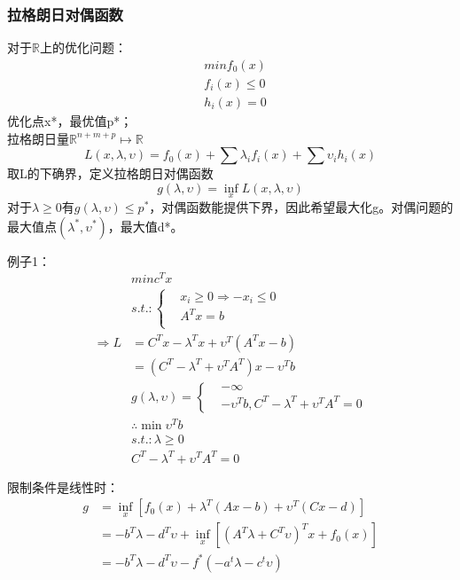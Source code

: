 \documentclass[UTF8]{../computerUniverse}
\begin{document}
\subsubsection{拉格朗日对偶函数}
对于$\mathbb{R}$上的优化问题：
\begin{equation}
\begin{split}
&minf_0(x)\\
&f_i(x)\leqslant 0\\
&h_i(x)=0
\end{split}
\end{equation} 
优化点x*，最优值p*；\\
拉格朗日量$\mathbb R^{n+m+p}\mapsto \mathbb R$
\begin{equation}
L(x,\lambda, \upsilon)=f_0(x)+\sum \lambda_if_i(x)+\sum \upsilon _ih_i(x)
\end{equation}
 取L的下确界，定义拉格朗日对偶函数
 \begin{equation}
    g(\lambda, \upsilon)=\inf_x L(x,\lambda, \upsilon)
\end{equation}
对于$\lambda \geqslant 0$有$g(\lambda, \upsilon) \leqslant p^*$，对偶函数能提供下界，因此希望最大化g。对偶问题的最大值点$(\lambda^*,\upsilon ^*)$，最大值d*。

例子1：
\begin{equation}
\begin{split}
&min c^Tx\\
&s.t.:
\begin{cases}
&x_i\geqslant0 \Rightarrow -x_i\leqslant 0\\
&A^Tx=b\\
\end{cases}\\
\Rightarrow L&=C^Tx-\lambda^Tx+\upsilon ^T(A^Tx-b)\\
&=\left( C^T-\lambda ^T +\upsilon ^TA^T \right)x-\upsilon ^Tb\\
&g(\lambda, \upsilon)= 
    \begin{cases}
      &-\infty \\
      &-\upsilon ^Tb, C^T-\lambda ^T +\upsilon ^TA^T=0
    \end{cases} \\
&\therefore \min \upsilon ^Tb\\
&s.t.:\lambda \geqslant 0\\
&C^T-\lambda ^T +\upsilon ^TA^T=0
\end{split}
\end{equation}
 
限制条件是线性时：
\begin{equation}
    \begin{split}
    g&=\inf_x \left[ f_0(x)+\lambda ^T(Ax-b)+\upsilon ^T(Cx-d) \right]\\
    &=-b^T\lambda-d^T\upsilon +\inf_x \left[ \left( A^T\lambda +C^T\upsilon \right)^Tx+f_0(x) \right]\\
    &= -b^T\lambda-d^T\upsilon-f^*\left( -a^t\lambda-c^t\upsilon \right)
    \end{split}
\end{equation}
 
\end{document}
